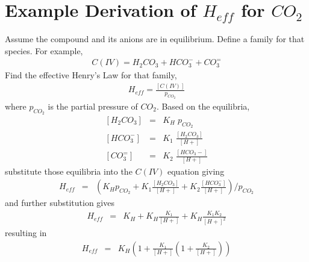 \documentclass[11pt, oneside]{article}   	%
\begin{document}
\section*{Example Derivation of $H_{eff}$ for $CO_2$}
Assume the compound and its anions are in equilibrium. 
Define a family for that species. 
For example, 
\begin{eqnarray*}
C(IV) = H_2CO_3 + HCO_3^- + CO_3^=
\end{eqnarray*}
Find the effective Henry's Law for that family, 
\begin{eqnarray*}
H_{eff} = \frac{\left[C(IV)\right]}{p_{CO_2}}
\end{eqnarray*} 
where $p_{CO_2}$ is the partial pressure of $CO_2$. Based on the equilibria, 
\begin{eqnarray*}
\left[H_2CO_3\right] &=& K_H \; p_{CO_2}   \\[3pt]
\left[HCO_3^-\right] &=& K_1 \; \frac{\left[H_2CO_3\right]}{\left[H+\right]} \\[3pt]
\left[CO_3^=\right] &=& K_2 \; \frac{\left[HCO_3-\right]}{\left[H+\right]}
\end{eqnarray*}
substitute those equilibria into the $C(IV)$ equation giving
\begin{eqnarray*}
H_{eff} &=& \left( K_H  p_{CO_2} + K_1  \frac{[H_2CO_3]}{[H+]} + K_2  \frac{[HCO_3^-]}{[H+]} \right)/p_{CO_2}   
\end{eqnarray*}
and further substitution gives
\begin{eqnarray*}
H_{eff} &=& K_H + K_H  \frac{K_1}{\left[H+\right]} + K_H\frac{K_1 K_2}{[H+]^2} 
\end{eqnarray*}
resulting in
\begin{eqnarray*}
H_{eff} &=& K_H  \left(1+  \frac{K_1}{[H+]}  \left(1 +   \frac{K_2}{[H+]}\right)\right) 
\end{eqnarray*}
\end{document}

